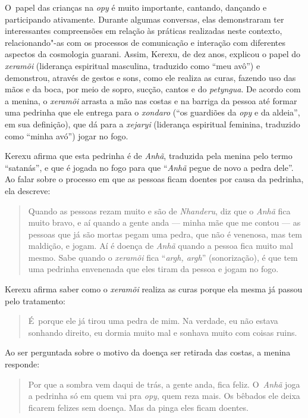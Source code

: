 O~papel das crianças na \emph{opy} é muito importante, cantando, dançando e
participando ativamente. Durante algumas conversas, elas demonstraram
ter interessantes compreensões em relação às práticas realizadas neste
contexto, relacionando"-as com os processos de comunicação e interação
com diferentes aspectos da cosmologia guarani. Assim, Kerexu, de dez
anos, explicou o papel do \emph{xeramõi} (liderança espiritual masculina,
traduzido como ``meu avô'') e demonstrou, através de gestos e sons, como
ele realiza as curas, fazendo uso das mãos e da boca, por meio de
sopro, sucção, cantos e do \emph{petyngua}. De acordo com a menina, o \emph{xeramõi}
arrasta a mão nas costas e na barriga da pessoa até formar uma pedrinha
que ele entrega para o \emph{xondaro} (``os guardiões da \emph{opy} e da aldeia'', em
sua definição), que dá para a \emph{xejaryi} (liderança espiritual feminina,
traduzido como ``minha avó'') jogar no fogo. 

Kerexu afirma que esta pedrinha é de \emph{Anhã}, traduzida pela menina pelo
termo ``satanás'', e que é jogada no fogo para que ``\emph{Anhã} pegue de novo a
pedra dele''. Ao falar sobre o processo em que as pessoas ficam doentes
por causa da pedrinha, ela descreve:

\begin{quote}
\noindent
Quando as pessoas rezam muito e são de \emph{Nhanderu}, diz que o \emph{Anhã} fica
muito bravo, e aí quando a gente anda --- minha mãe que me contou --- as
pessoas que já são mortas pegam uma pedra, que não é venenosa, mas tem
maldição, e jogam. Aí é doença de \emph{Anhã} quando a pessoa fica muito mal
mesmo. Sabe quando o \emph{xeramõi} fica ``\emph{argh, argh}'' (sonorização), é que tem
uma pedrinha envenenada que eles tiram da pessoa e jogam no fogo.
\end{quote}

Kerexu afirma saber como o \emph{xeramõi} realiza as curas porque ela mesma já
passou pelo tratamento:

\begin{quote}
\noindent
É~porque ele já tirou uma pedra de mim. Na verdade, eu não estava
sonhando direito, eu dormia muito mal e sonhava muito com coisas ruins.
\end{quote}

Ao ser perguntada sobre o motivo da doença ser retirada das costas, a
menina responde:

\begin{quote}
\noindent
Por que a sombra vem daqui de trás, a gente anda, fica feliz. O~\emph{Anhã}
joga a pedrinha só em quem vai pra \emph{opy}, quem reza mais. Os bêbados ele
deixa ficarem felizes sem doença. Mas da pinga eles ficam doentes.
\end{quote}


